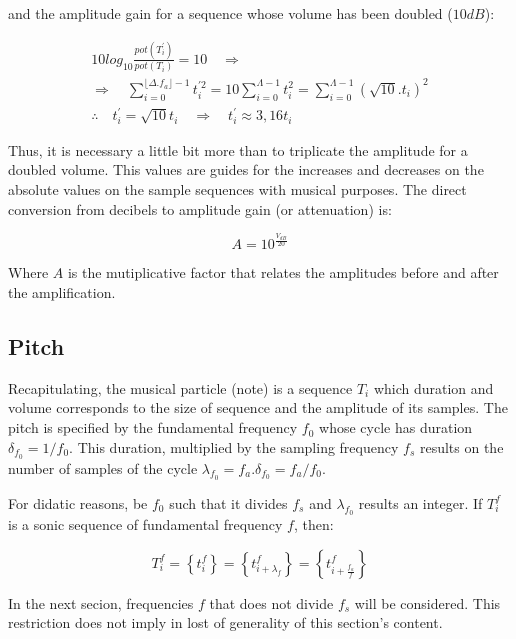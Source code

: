 \documentclass[
 aip,
 jmp,
 amsmath,amssymb,
 reprint,
]{revtex4-1}
\begin{document}
and the amplitude gain for a sequence whose volume has been doubled ($10dB$):

\begin{equation}\label{eq:dobraVol}
\begin{split}
10log_{10}\frac{pot(T^{'}_i)}{pot(T_i)} = 10 \quad \Rightarrow \\ \Rightarrow \quad \sum_{i=0}^{\lfloor \Delta.f_a \rfloor -1}t^{'2}_i=10\sum_{i=0}^{\Lambda-1}t_i^2=\sum_{i=0}^{\Lambda-1}(\sqrt{10}.t_i)^2 \\
\therefore \quad t^{'}_i=\sqrt{10}t_i \quad \Rightarrow \quad t^{'}_i \approx 3,16t_i
\end{split}
\end{equation}

Thus, it is necessary a little bit more than to triplicate the amplitude for a doubled volume. This values are guides for the increases and decreases on the absolute values on the sample sequences with musical purposes. The direct conversion from decibels to amplitude gain (or attenuation) is:

\begin{equation}\label{ampDec}
A = 10^{\frac{V_{dB}}{20}}
\end{equation}

Where $A$ is the mutiplicative factor that relates the amplitudes before and after the amplification.

\subsection{Pitch}
Recapitulating, the musical particle (note) is a sequence $T_i$ which duration and volume corresponds to the size of sequence and the amplitude of its samples. The pitch is specified by the fundamental frequency $f_0$ whose cycle has duration $\delta_{f_0}=1/f_0$. This duration, multiplied by the sampling frequency $f_s$ results on the number of samples of the cycle $\lambda_{f_0}=f_a . \delta_{f_0} =f_a/f_0$.

For didatic reasons, be $f_0$ such that it divides $f_s$ and $\lambda_{f_0}$ results an integer. If $T_i^f$ is a sonic sequence of fundamental frequency $f$, then:

\begin{equation}\label{periodicidade}
     T^f_i=\left\{ t_i^f \right\}=\left\{ t^f_{i+\lambda_{f}}  \right\}= \left\{ t^f_{i+\frac{f_a}{f}} \right\}
\end{equation}

In the next secion, frequencies $f$ that does not divide $f_s$ will be considered. This restriction does not imply in lost of generality of this section's content.
\end{document}

